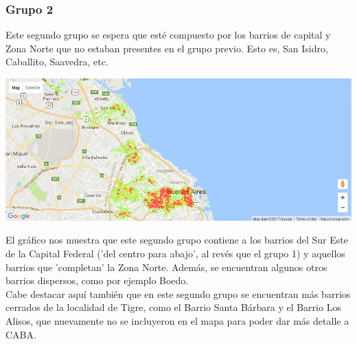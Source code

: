 \documentclass[a4paper, 10pt]{article}
\newcommand\tab[1][0.5cm]{\hspace*{#1}}
\begin{document}
				\subsubsection{Grupo 2}
					Este segundo grupo se espera que esté compuesto por los barrios de capital y Zona Norte que no estaban presentes
					en el grupo previo. Esto es, San Isidro, Caballito, Saavedra, etc.
					\begin{center}
						\includegraphics[width=\textwidth]{images/m2Group2HeatMap}
				  	\end{center}
				  	\tab El gráfico nos muestra que este segundo grupo contiene a los barrios del Sur Este de la Capital Federal
				  	('del centro para abajo', al revés que el grupo 1) y aquellos barrios que 'completan' la Zona Norte. Además, se
				  	encuentran algunos otros barrios dispersos, como por ejemplo Boedo. \\
				  	\tab Cabe destacar aquí también que en este segundo grupo se encuentran más barrios cerrados de la localidad de
				  	Tigre, como el Barrio Santa Bárbara y el Barrio Los Alisos, que nuevamente no se incluyeron en el mapa para
				  	poder dar más detalle a CABA.
\end{document}
